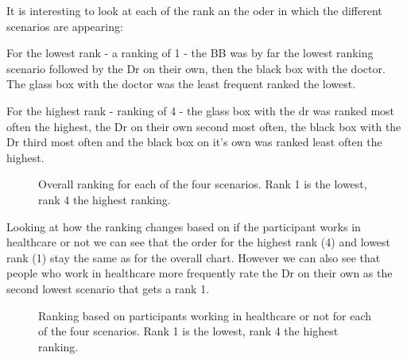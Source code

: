 \documentclass[manuscript,screen,review]{acmart}
\begin{document}
It is interesting to look at each of the rank an the oder in which the different scenarios are appearing:

For the lowest rank - a ranking of 1 - the BB was by far the lowest ranking scenario followed by the Dr on their own, then the black box with the doctor. The glass box with the doctor was the least frequent ranked the lowest.

For the highest rank - ranking of 4 - the glass box with the dr was ranked most often the highest, the Dr on their own second most often, the black box with the Dr third most often and the black box on it's own was ranked least often the highest.

\begin{figure}[h]
    \caption{Overall ranking for each of the four scenarios. Rank 1 is the lowest, rank 4 the highest ranking.}
    \label{fig:overall-ranking}
\end{figure}

Looking at how the ranking changes based on if the participant works in healthcare or not we can see that the order for the highest rank (4) and lowest rank (1) stay the same as for the overall chart. However we can also see that people who work in healthcare more frequently rate the Dr on their own as the second lowest scenario that gets a rank 1.

\begin{figure}[h]
    \caption{Ranking based on participants working in healthcare or not for each of the four scenarios. Rank 1 is the lowest, rank 4 the highest ranking.}
    \label{fig:overall-ranking}
\end{figure}
\end{document}
